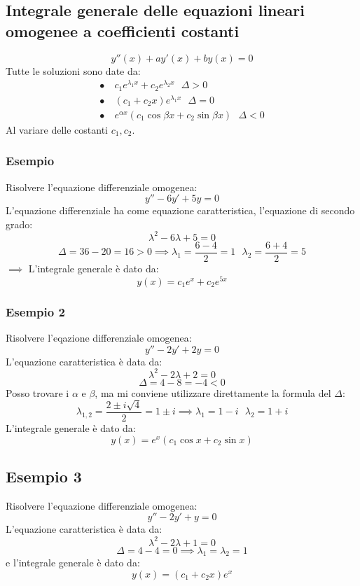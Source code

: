 \documentclass[../../main.tex]{subfiles}
\begin{document}
\subsection{Integrale generale delle equazioni lineari omogenee a coefficienti costanti}
\[
    y''(x) + ay'(x) + by(x) = 0
\]
Tutte le soluzioni sono date da:
\begin{align*}
    \bullet \  & c_1e^{\lambda_1 x} + c_2e^{\lambda_2 x} \ \ \ \Delta > 0           \\
    \bullet \  & (c_1 + c_2x)e^{\lambda_1 x} \ \ \ \Delta = 0                       \\
    \bullet \  & e^{\alpha x}(c_1\cos{\beta x} + c_2\sin{\beta x}) \ \ \ \Delta < 0
\end{align*}
Al variare delle costanti $c_1, c_2$.

\subsubsection{Esempio}
Risolvere l'equazione differenziale omogenea:
\[
    y'' - 6y' + 5y = 0\]
L'equazione differenziale ha come equazione caratteristica, l'equazione di
secondo grado:
\[
    \lambda^2 - 6\lambda + 5 = 0
\]
\[
    \Delta = 36 - 20 = 16 > 0 \implies \lambda_1 = \frac{6-4}{2} = 1 \ \ \ \lambda_2 = \frac{6+4}{2} = 5
\]
$\implies$ L'integrale generale è dato da:
\[
    y(x) = c_1e^x + c_2e^{5x}
\]
\subsubsection{Esempio 2}
Risolvere l'eqazione differenziale omogenea:
\[
    y'' - 2y' + 2y = 0
\]
L'equazione caratteristica è data da:
\[
    \lambda^2 - 2\lambda + 2 = 0
\]
\[
    \Delta = 4 - 8 = -4 < 0
\]
Posso trovare i $\alpha$ e $\beta$, ma mi conviene utilizzare direttamente la
formula del $\Delta$:
\[
    \lambda_{1,2} = \frac{2 \pm i\sqrt{4}}{2} = 1 \pm i \implies \lambda_1 = 1 - i \ \ \ \lambda_2 = 1 + i
\]
L'integrale generale è dato da:
\[
    y(x) = e^x(c_1\cos{x} + c_2\sin{x})
\]

\subsection{Esempio 3}
Risolvere l'equazione differenziale omogenea:
\[
    y'' - 2y' + y = 0
\]
L'equazione caratteristica è data da:
\[
    \lambda^2 - 2\lambda + 1 = 0
\]
\[
    \Delta = 4 - 4 = 0 \implies \lambda_1 = \lambda_2 = 1
\]
e l'integrale generale è dato da:
\[
    y(x) = (c_1 + c_2x)e^x
\]
\end{document}
